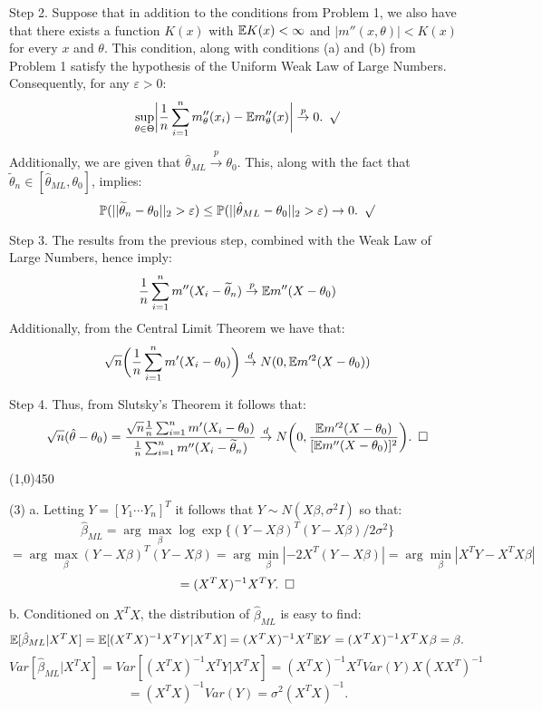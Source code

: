 \documentclass[12pt]{article}
\begin{document}
\noindent
Step 2. Suppose that in addition to the conditions from Problem 1, we also have that there exists a function $K(x)$ with $\mathbb{E} K(x) < \infty$ and $|m''(x,\theta)| < K(x)$ for every $x$ and $\theta$. This condition, along with conditions (a) and (b) from Problem 1 satisfy the hypothesis of the Uniform Weak Law of Large Numbers. Consequently, for any $\varepsilon>0$:
$$\sup_{\theta\in\Theta} \biggl|\frac{1}{n} \sum_{i=1}^n m''_\theta(x_i) - \mathbb{E} m''_\theta (x) \biggr| \overset{p}\to 0. \hspace{5 pt} \surd$$

\noindent
Additionally, we are given that $\hat{\theta}_{ML} \overset{p}\to \theta_0$. This, along with the fact that $\widetilde{\theta}_n \in [\hat{\theta}_{ML}, \theta_0]$, implies:
$$\mathbb{P}(||\widetilde{\theta}_n-\theta_0||_2 > \varepsilon)
\leq \mathbb{P}(||\hat{\theta}_{ML}-\theta_0||_2 > \varepsilon)
\to 0. \hspace{5 pt} \surd$$

\noindent
Step 3. The results from the previous step, combined with the Weak Law of Large Numbers, hence imply:
$$\frac{1}{n} \sum_{i=1}^n m''(X_i-\widetilde\theta_n) \overset{p}\to \mathbb{E} m''(X-\theta_0)$$
Additionally, from the Central Limit Theorem we have that:
$$\sqrt{n} \biggl( \frac{1}{n}\sum_{i=1}^n m'(X_i-\theta_0) \biggr) \overset{d}\to N(0, \mathbb{E} m'^2(X-\theta_0))$$

\noindent
Step 4. Thus, from Slutsky's Theorem it follows that:
$$\sqrt{n}(\hat{\theta}-\theta_0) 
= \frac{\sqrt{n} \frac{1}{n}\sum_{i=1}^n m'(X_i-\theta_0)}{\frac{1}{n} \sum_{i=1}^n m''(X_i-\widetilde\theta_n)}
\overset{d}\to N \biggl(0, \frac{\mathbb{E} m'^2(X-\theta_0)}{[\mathbb{E} m''(X-\theta_0)]^2} \biggr).
 \hspace{5 pt} \square$$
 
 \begin{center}
\line(1,0){450}
\end{center}

\pagebreak
\noindent 
(3) a. Letting $Y = [Y_1 \cdots Y_n]^T$ it follows that $Y \sim N(X\beta, \sigma^2 I)$ so that:
$$\hat{\beta}_{ML} = \arg\max_\beta \log \exp\{(Y-X\beta)^T(Y-X\beta)/2\sigma^2\}$$
$$= \arg\max_\beta (Y-X\beta)^T(Y-X\beta) 
= \arg\min_\beta |-2X^T(Y-X\beta)| 
= \arg\min_\beta |X^TY - X^TX\beta |$$
$$= (X^TX)^{-1}X^TY. \hspace{5 pt} \square$$

\noindent
b. Conditioned on $X^TX$, the distribution of $\hat{\beta}_{ML}$ is easy to find:
$$\mathbb{E} [\hat{\beta}_{ML}|X^TX] = \mathbb{E} [(X^TX)^{-1}X^TY|X^TX] = (X^TX)^{-1}X^T \mathbb{E} Y = (X^TX)^{-1}X^T X\beta = \beta.$$
$$Var [\hat{\beta}_{ML}|X^TX] = Var [(X^TX)^{-1}X^TY|X^TX] = (X^TX)^{-1}X^T Var(Y) X (X X^T)^{-1}$$
$$= (X^TX)^{-1} Var(Y) = \sigma^2 (X^TX)^{-1}.$$
\end{document}
